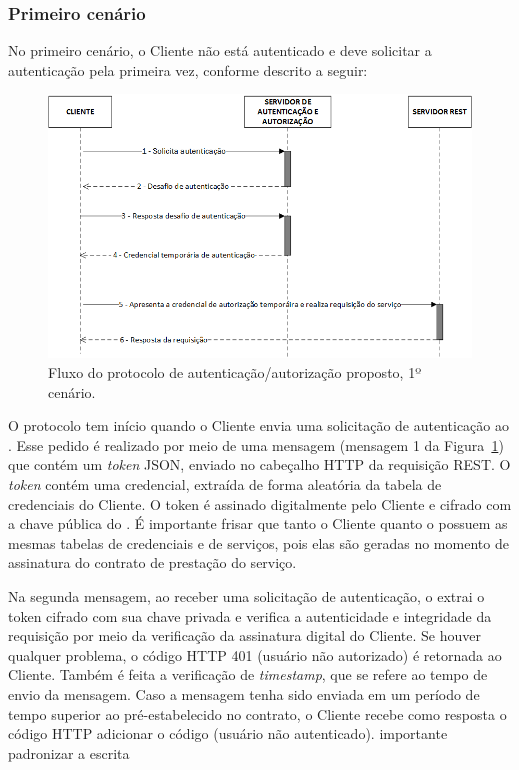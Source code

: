 \subsubsection{Primeiro cenário}

No primeiro cenário, o Cliente não está autenticado e deve solicitar a autenticação pela primeira vez, conforme descrito a seguir:

\begin{figure}[!htb]
    \centering
    \includegraphics[width=1.0\textwidth]{fluxo_autenticacao.png}
    \caption{Fluxo do protocolo de autenticação/autorização proposto, 1º cenário.}
    \label{fig:protocoloseguro}
\end{figure}


O protocolo tem início quando o Cliente envia uma solicitação de autenticação ao \servidorAA.
Esse pedido é realizado por meio de uma mensagem (mensagem 1 da Figura~\ref{fig:protocoloseguro}) 
que contém um \emph{token} JSON, enviado no cabeçalho HTTP da requisição REST. O \emph{token} contém uma 
credencial, extraída de forma aleatória da tabela de credenciais do Cliente. O token é assinado digitalmente pelo Cliente 
e cifrado com a chave pública do \servidorAA. É importante frisar que tanto o Cliente quanto o 
\servidorAA{} possuem as mesmas tabelas de credenciais e de serviços, pois elas são 
geradas no momento de assinatura do contrato de prestação do serviço.

Na segunda mensagem, ao receber uma solicitação de autenticação, o \servidorAA{} extrai o 
token cifrado com sua chave privada e verifica a autenticidade e integridade da requisição por meio da verificação da assinatura digital do Cliente.  
Se houver qualquer problema, o c\'{o}digo HTTP 401 (usuário não autorizado) é retornada ao Cliente.
Tamb\'{e}m \'{e} feita a verifica\c c\~{a}o de \emph{timestamp}, que se refere ao tempo de envio da mensagem. Caso a mensagem tenha 
sido enviada em um período de tempo superior ao pré-estabelecido no contrato, o Cliente recebe 
como resposta o c\'{o}digo HTTP {\color{red}adicionar o c\'{o}digo} (usuário não autenticado). {\color{red}importante padronizar a escrita}

